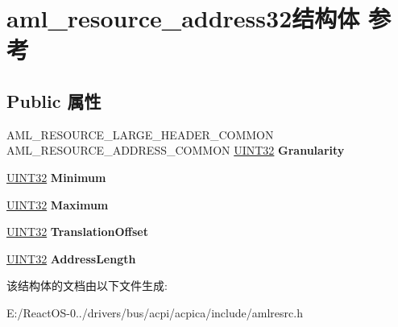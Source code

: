 \hypertarget{structaml__resource__address32}{}\section{aml\+\_\+resource\+\_\+address32结构体 参考}
\label{structaml__resource__address32}
\subsection*{Public 属性}
\begin{DoxyCompactItemize}
\item 
\mbox{\label{structaml__resource__address32_a1ac4ddac81be490ebee36a48f5ec26fa}} 
A\+M\+L\+\_\+\+R\+E\+S\+O\+U\+R\+C\+E\+\_\+\+L\+A\+R\+G\+E\+\_\+\+H\+E\+A\+D\+E\+R\+\_\+\+C\+O\+M\+M\+ON A\+M\+L\+\_\+\+R\+E\+S\+O\+U\+R\+C\+E\+\_\+\+A\+D\+D\+R\+E\+S\+S\+\_\+\+C\+O\+M\+M\+ON \hyperlink{_processor_bind_8h_ae1e6edbbc26d6fbc71a90190d0266018}{U\+I\+N\+T32} {\bfseries Granularity}
\item 
\mbox{\label{structaml__resource__address32_a6e5e0d32359d271932c1bb3cb3e35f18}} 
\hyperlink{_processor_bind_8h_ae1e6edbbc26d6fbc71a90190d0266018}{U\+I\+N\+T32} {\bfseries Minimum}
\item 
\mbox{\label{structaml__resource__address32_a3dccb94be23c1315a6f662d61883e7bb}} 
\hyperlink{_processor_bind_8h_ae1e6edbbc26d6fbc71a90190d0266018}{U\+I\+N\+T32} {\bfseries Maximum}
\item 
\mbox{\label{structaml__resource__address32_a569314d25903efb3818222e82031e784}} 
\hyperlink{_processor_bind_8h_ae1e6edbbc26d6fbc71a90190d0266018}{U\+I\+N\+T32} {\bfseries Translation\+Offset}
\item 
\mbox{\label{structaml__resource__address32_af49f9edd5f85b59528bb75ba6af12686}} 
\hyperlink{_processor_bind_8h_ae1e6edbbc26d6fbc71a90190d0266018}{U\+I\+N\+T32} {\bfseries Address\+Length}
\end{DoxyCompactItemize}


该结构体的文档由以下文件生成\+:\begin{DoxyCompactItemize}
\item 
E\+:/\+React\+O\+S-\/0../drivers/bus/acpi/acpica/include/amlresrc.\+h\end{DoxyCompactItemize}
